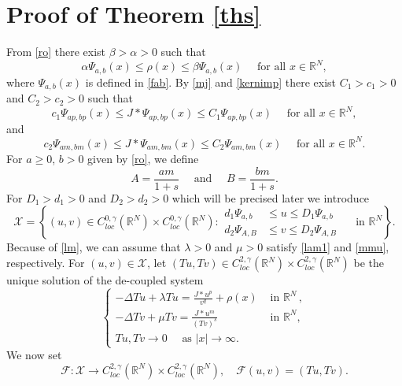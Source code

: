 \documentclass[leqno,12pt]{article}
\newcommand{\R}{\mathbb R}
\numberwithin{equation}{section}
\begin{document}
\section{Proof of Theorem \ref{ths}}
From \eqref{ro} there exist $\beta>\alpha>0$ such that 
\begin{equation}\label{ro1}
\alpha \Psi_{a,b}(x)\leq \rho(x)\leq \beta \Psi_{a,b}(x)\quad\mbox{ for all }x\in \R^N,
\end{equation}
where $\Psi_{a,b}(x)$ is defined in \eqref{fab}. By \eqref{mj} and \eqref{kernimp} there exist $C_1>c_1>0$ and $C_2>c_2>0$ such that
\begin{equation}\label{mj1}
c_1\Psi_{ap,bp}(x) \leq J*\Psi_{ap,bp}(x)\leq C_1 \Psi_{ap,bp}(x) \quad\mbox{ for all }x\in \R^N,
\end{equation}
and
\begin{equation}\label{mj2}
c_2\Psi_{am,bm}(x) \leq J*\Psi_{am,bm}(x)\leq C_2 \Psi_{am,bm}(x) \quad\mbox{ for all }x\in \R^N.
\end{equation}
For $a\geq 0$, $b>0$ given by \eqref{ro}, we define
$$
A=\frac{am}{1+s}\quad\mbox{ and }\quad B=\frac{bm}{1+s}.
$$
For $D_1>d_1>0$ and $D_2>d_2>0$ which will be precised later we introduce
\begin{equation}\label{eqset}
\mathscr{X}=\left\{(u,v)\in C^{0,\gamma}_{loc}(\R^N)\times C^{0,\gamma}_{loc}(\R^N): 
\begin{aligned}
d_1 \Psi_{a,b} & \leq u\leq  D_1 \Psi_{a,b}\\
d_2 \Psi_{A,B} & \leq v\leq  D_2 \Psi_{A,B}
\end{aligned} \quad\mbox{ in }\R^N \right\}.
\end{equation}
Because of \eqref{lm}, we can assume that
$\lambda>0$ and $\mu>0$ satisfy \eqref{lam1} and \eqref{mmu}, respectively. 
For $(u,v)\in \mathscr{X}$, let $(Tu, Tv)\in C^{2, \gamma}_{loc}(\R^N)\times C^{2, \gamma}_{loc}(\R^N)$ be the unique solution of the de-coupled system
\begin{equation}\label{eqw}
\begin{cases}
\displaystyle   -\Delta Tu+\lambda Tu=\frac{J * u^p}{v^q}+\rho(x) &\mbox{ in }\R^N\, ,\\[0.1in]
\displaystyle   -\Delta Tv+\mu Tv=\frac{J * u^m}{(Tv)^s} &\mbox{ in }\R^N,\\[0.1in]
Tu, Tv\to 0\quad \mbox{ as } |x|\to \infty.&
\end{cases}
\end{equation}
We now set
\begin{equation}\label{fx}
\mathscr{F}:\mathscr{X}\to C^{2, \gamma}_{loc}(\R^N)\times C^{2, \gamma}_{loc}(\R^N),\quad \mathscr{F}(u,v)=(Tu, Tv).
\end{equation}
\end{document}
